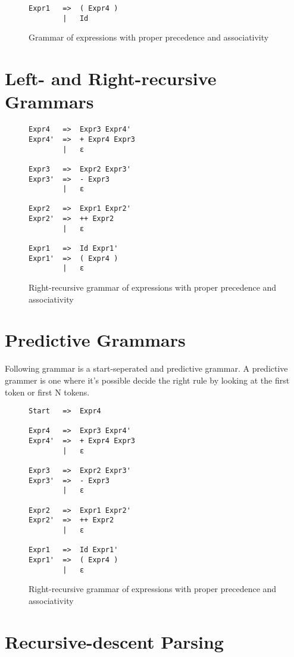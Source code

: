 \documentclass[hidelinks]{uva-inf-article}
\begin{document}
\begin{flushleft}
\begin{figure}[h]
\begin{lstlisting}
Expr1   =>  ( Expr4 ) 
        |   Id
\end{lstlisting}
\caption{Grammar of expressions with proper precedence and associativity}
\label{fig:1}
\end{figure}
\newpage
\section{Left- and Right-recursive Grammars}
\begin{figure}[h]
\begin{lstlisting}
Expr4   =>  Expr3 Expr4'
Expr4'  =>  + Expr4 Expr3
        |   ε
    
Expr3   =>  Expr2 Expr3'
Expr3'  =>  - Expr3
        |   ε
    
Expr2   =>  Expr1 Expr2'
Expr2'  =>  ++ Expr2
        |   ε
    
Expr1   =>  Id Expr1'
Expr1'  =>  ( Expr4 )
        |   ε
\end{lstlisting}
\caption{Right-recursive grammar of expressions with proper precedence and associativity}
\label{fig:2}
\end{figure}
\section{Predictive Grammars}
Following grammar is a start-seperated and predictive grammar.
A predictive grammer is one where it's possible decide the right rule by looking at the first token or first N tokens.
\begin{figure}[h]
\begin{lstlisting}
Start   =>  Expr4

Expr4   =>  Expr3 Expr4'
Expr4'  =>  + Expr4 Expr3
        |   ε

Expr3   =>  Expr2 Expr3'
Expr3'  =>  - Expr3
        |   ε

Expr2   =>  Expr1 Expr2'
Expr2'  =>  ++ Expr2
        |   ε

Expr1   =>  Id Expr1'
Expr1'  =>  ( Expr4 )
        |   ε
\end{lstlisting}
\caption{Right-recursive grammar of expressions with proper precedence and associativity}
\label{fig:3}
\end{figure}
\newpage
\section{Recursive-descent Parsing}

\end{flushleft}
\end{document}

